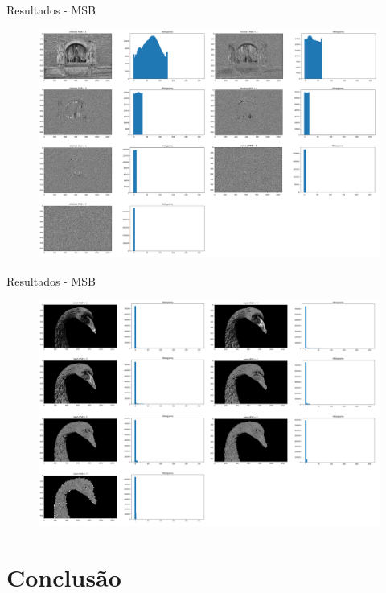 \documentclass[]{beamer}
\begin{document}
\begin{frame}{Resultados - MSB}
    \begin{figure}
        \includegraphics[scale=0.16]{Imagens/resultados-shutters-msb.png}
    \end{figure}  
\end{frame}

\begin{frame}{Resultados - MSB}
    \begin{figure}
        \includegraphics[scale=0.16]{Imagens/resultados-swan-msb.png}
    \end{figure}  
\end{frame}

\section{Conclusão}
\end{document}
